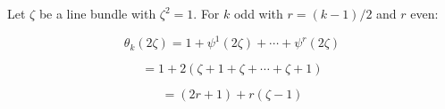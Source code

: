 Let $\zeta$ be a line bundle with $\zeta^2 = 1$. For $k$ odd with $r = (k-1)/2$ and $r$ even:

$$
\theta_k(2\zeta) = 1 + \psi^1(2\zeta) + \cdots + \psi^r(2\zeta)
$$

$$
= 1 + 2(\zeta + 1 + \zeta + \cdots + \zeta + 1)
$$

$$
= (2r + 1) + r(\zeta - 1)
$$
